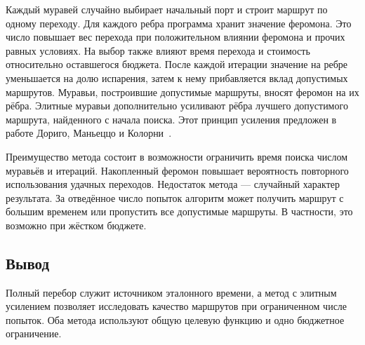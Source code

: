 Каждый муравей случайно выбирает начальный порт и строит маршрут по одному переходу. Для каждого ребра программа хранит значение феромона. Это число повышает вес перехода при положительном влиянии феромона и прочих равных условиях. На выбор также влияют время перехода и стоимость относительно оставшегося бюджета. После каждой итерации значение на ребре уменьшается на долю испарения, затем к нему прибавляется вклад допустимых маршрутов. Муравьи, построившие допустимые маршруты, вносят феромон на их рёбра. Элитные муравьи дополнительно усиливают рёбра лучшего допустимого маршрута, найденного с начала поиска. Этот принцип усиления предложен в работе Дориго, Маньеццо и Колорни~\cite{ant}.

Преимущество метода состоит в возможности ограничить время поиска числом муравьёв и итераций. Накопленный феромон повышает вероятность повторного использования удачных переходов. Недостаток метода --- случайный характер результата. За отведённое число попыток алгоритм может получить маршрут с большим временем или пропустить все допустимые маршруты. В частности, это возможно при жёстком бюджете.

\subsection*{Вывод}

Полный перебор служит источником эталонного времени, а метод с элитным усилением позволяет исследовать качество маршрутов при ограниченном числе попыток. Оба метода используют общую целевую функцию и одно бюджетное ограничение.

